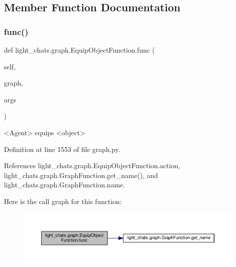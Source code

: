 \subsection{Member Function Documentation}
\mbox{\label{classlight__chats_1_1graph_1_1EquipObjectFunction_a4eaec48030f12c92dcddf9f976b31604}} 
\subsubsection{\texorpdfstring{func()}{func()}}
{\footnotesize\ttfamily def light\+\_\+chats.\+graph.\+Equip\+Object\+Function.\+func (\begin{DoxyParamCaption}\item[{}]{self,  }\item[{}]{graph,  }\item[{}]{args }\end{DoxyParamCaption})}

\begin{DoxyVerb}<Agent> equips <object>\end{DoxyVerb}
 

Definition at line 1553 of file graph.\+py.



References light\+\_\+chats.\+graph.\+Equip\+Object\+Function.\+action, light\+\_\+chats.\+graph.\+Graph\+Function.\+get\+\_\+name(), and light\+\_\+chats.\+graph.\+Graph\+Function.\+name.

Here is the call graph for this function\+:
\nopagebreak
\begin{figure}[H]
\begin{center}
\leavevmode
\includegraphics[width=350pt]{classlight__chats_1_1graph_1_1EquipObjectFunction_a4eaec48030f12c92dcddf9f976b31604_cgraph}
\end{center}
\end{figure}
\mbox{\label{classlight__chats_1_1graph_1_1EquipObjectFunction_a63956c69d130eb078d3c987b8b220190}} 
